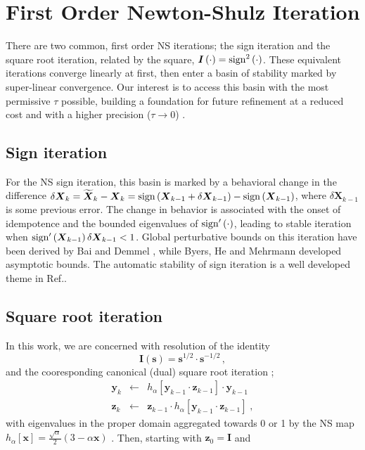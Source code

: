 \documentclass[letterpaper,twocolumn,amsmath,amsfont,amssymb,english,aps,jcp,preprintnumbers,groupaddress,nofootinbib,tightenlines,floatfix]{revtex4}
\newcommand{\mat}[1]{\boldsymbol{#1}}
\theoremstyle{plain}
\theoremstyle{remark}
\theoremstyle{plain}
\begin{document}

\section{First Order Newton-Shulz Iteration}

There are two common, first order NS iterations; the sign iteration
and the square root iteration, related by the square, $\mat{I}\left(
\cdot \right)= {\rm sign}^2\left( \cdot \right) $.  These equivalent
iterations converge linearly at first, then enter a basin of stability
marked by super-linear convergence.  Our interest is to access this
basin with the most permissive $\tau$ possible, building a foundation
for future refinement
at a reduced cost and with a higher precision ($\tau \rightarrow 0$)
\cite{MChallacombe16}.

\subsection{Sign iteration}

For the NS sign iteration, this basin is marked by a behavioral change
in the difference $\delta \mat{X}_k = \widetilde{\mat{X}}_k -\mat{X}_k
= {\rm sign} \left(\mat{X}_{k-1}+\delta \mat{X}_{k-1} \right) -{\rm
  sign} \left(\mat{X}_{k-1} \right)$, where $\delta \mat{X}_{k-1}$ is
some previous error.  The change in behavior is associated with the
onset of idempotence and the bounded eigenvalues of ${\rm sign}'\left(
\cdot \right)$, leading to stable iteration when ${\rm sign}'\left(
\mat{X}_{k-1} \right) \delta \mat{X}_{k-1} < 1 $.  Global perturbative
bounds on this iteration have been derived by Bai and Demmel
\cite{Bai98usingthe}, while Byers, He and Mehrmann \cite{} developed
asymptotic bounds.  The automatic stability of sign iteration is a
well developed theme in Ref.\cite{Higham08}.

\subsection{Square root iteration}

In this work, we are concerned with resolution of the identity \cite{}
\begin{equation}
\mat{I} \left( \mat{s} \right) =\mat{s}^{1/2} \cdot \mat{s}^{-1/2} \, ,
\end{equation}
and the cooresponding canonical (dual) square root iteration \cite{};
\begin{eqnarray}\label{cannonical}
\mat{y}_k &\leftarrow& h_\alpha \left[ \mat{y}_{k-1} \cdot \mat{z}_{k-1} \right] \cdot \mat{y}_{k-1}  \nonumber \\
\mat{z}_k &\leftarrow& \mat{z}_{k-1} \cdot h_\alpha \left[ \mat{y}_{k-1} \cdot \mat{z}_{k-1} \right] \; ,
\end{eqnarray}
with eigenvalues in the proper domain aggregated towards 0 or 1 by the
NS map $h_\alpha[\mat{x}]=\frac{\sqrt{\alpha}}{2} \left(3-\alpha
\mat{x} \right)$ \cite{}.  Then, starting with $\mat{z}_0=\mat{I}$ and
\end{document}
